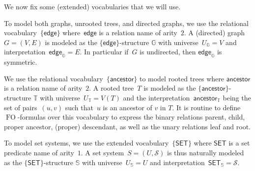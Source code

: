 \documentclass{lmcs} %
\newcommand{\FO}{\ensuremath{\operatorname{FO}}\xspace}
\newcommand{\ancestor}{\mathsf{ancestor}}
\newcommand{\edge}{\ensuremath{\mathsf{edge}}\xspace}
\newcommand{\SET}{\ensuremath{\mathsf{SET}}\xspace}
\begin{document}
We now fix some (extended) vocabularies that we will use.
\begin{description}[nosep]
    \item[Graphs]
        To model both graphs, unrooted trees, and directed graphs,
        we use the relational vocabulary~$\{\edge\}$
        where~$\edge$ is a relation name of arity~$2$.
        A (directed) graph~$G=(V,E)$ is modeled
        as the $\{\edge\}$-structure $\mathbb{G}$
        with universe~$U_{\mathbb{G}}=V$
        and interpretation~$\edge_{\mathbb{G}}=E$.
        In particular if~$G$ is undirected, then $\edge_{\mathbb{G}}$ is symmetric.
    \item[Rooted trees]
        We use the relational vocabulary~$\{\ancestor\}$ to model rooted trees
        where $\ancestor$ is a relation name of arity~$2$.
        A rooted tree~$T$ is modeled
        as the $\{\ancestor\}$-structure $\mathbb{T}$
        with universe~$U_{\mathbb{T}}=V(T)$
        and the interpretation~$\ancestor_{\mathbb{T}}$
        being the set of pairs~$(u,v)$ such that~$u$ is an ancestor of $v$ in $T$.
        It is routine to define \FO-formulas over this vocabulary
        to express the binary relations parent, child, proper ancestor, (proper) descendant,
        as well as the unary relations leaf and root.%
    \item[Set systems]
        To model set systems, we use the extended vocabulary~$\{\SET\}$
        where $\SET$ is a set predicate name of arity~$1$.
        A set system~$S=(U,\mathcal{S})$ is thus naturally modeled
        as the $\{\SET\}$-structure $\mathbb{S}$
        with universe~$U_{\mathbb{S}}=U$
        and interpretation~$\SET_{\mathbb{S}}=\mathcal{S}$.
\end{description}
\end{document}
